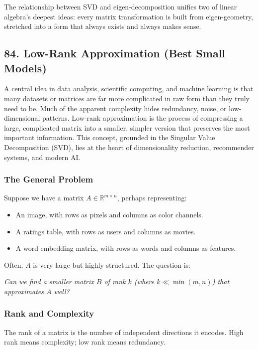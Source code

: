 \documentclass[
  letterpaper,
  DIV=11,
  numbers=noendperiod]{scrreprt}
\providecommand{\tightlist}{%
  \setlength{\itemsep}{0pt}\setlength{\parskip}{0pt}}
\begin{document}
The relationship between SVD and eigen-decomposition unifies two of
linear algebra's deepest ideas: every matrix transformation is built
from eigen-geometry, stretched into a form that always exists and always
makes sense.

\subsection{84. Low-Rank Approximation (Best Small
Models)}\label{low-rank-approximation-best-small-models}

A central idea in data analysis, scientific computing, and machine
learning is that many datasets or matrices are far more complicated in
raw form than they truly need to be. Much of the apparent complexity
hides redundancy, noise, or low-dimensional patterns. Low-rank
approximation is the process of compressing a large, complicated matrix
into a smaller, simpler version that preserves the most important
information. This concept, grounded in the Singular Value Decomposition
(SVD), lies at the heart of dimensionality reduction, recommender
systems, and modern AI.

\subsubsection{The General Problem}\label{the-general-problem}

Suppose we have a matrix \(A \in \mathbb{R}^{m \times n}\), perhaps
representing:

\begin{itemize}
\tightlist
\item
  An image, with rows as pixels and columns as color channels.
\item
  A ratings table, with rows as users and columns as movies.
\item
  A word embedding matrix, with rows as words and columns as features.
\end{itemize}

Often, \(A\) is very large but highly structured. The question is:

\emph{Can we find a smaller matrix \(B\) of rank \(k\) (where
\(k \ll \min(m, n)\)) that approximates \(A\) well?}

\subsubsection{Rank and Complexity}\label{rank-and-complexity}

The rank of a matrix is the number of independent directions it encodes.
High rank means complexity; low rank means redundancy.
\end{document}
